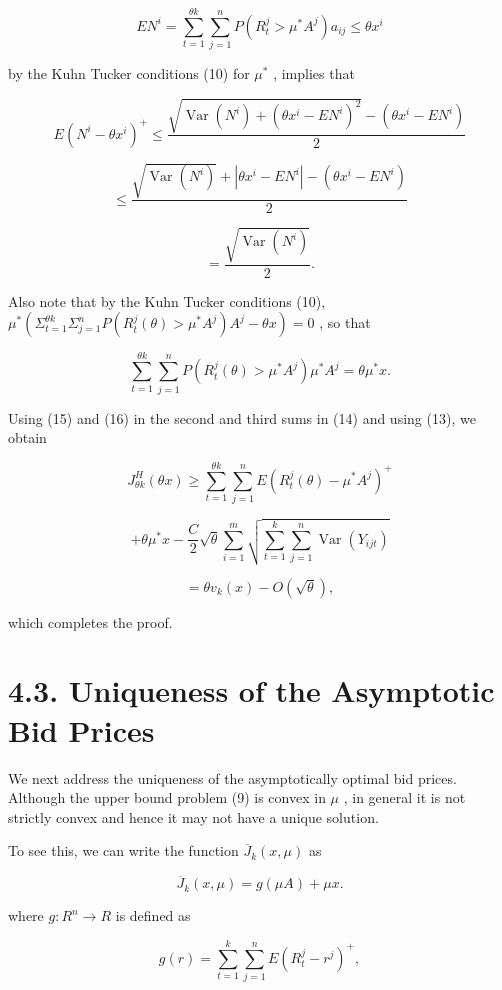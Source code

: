 \[
EN^{i} = \sum_{t = 1}^{\theta k} \sum_{j = 1}^{n} P(R_{t}^{j} > \mu^{*} A^{j}) a_{ij} \leq \theta x^{i}
\]

by the Kuhn Tucker conditions (10) for \(\mu^{*}\) , implies that

\[
E(N^{i} - \theta x^{i})^{+}\leq \frac{\sqrt{\operatorname{Var}(N^{i}) + (\theta x^{i} - E N^{i})^{2}} - (\theta x^{i} - E N^{i})}{2}
\]

\[
\leq \frac{\sqrt{\operatorname{Var}(N^{i})} + |\theta x^{i} - E N^{i}| - (\theta x^{i} - E N^{i})}{2}
\]

\[
= \frac{\sqrt{\operatorname{Var}(N^{i})}}{2}. \tag{15}
\]

Also note that by the Kuhn Tucker conditions (10),
\(\mu^{*}(\Sigma_{t = 1}^{\theta k}\Sigma_{j = 1}^{n}P(R_{t}^{j}(\theta) > \mu^{*}A^{j})A^{j} - \theta x) = 0\)
, so that

\[
\sum_{t = 1}^{\theta k}\sum_{j = 1}^{n}P(R_{t}^{j}(\theta) > \mu^{*}A^{j})\mu^{*}A^{j} = \theta \mu^{*}x. \tag{16}
\]

Using (15) and (16) in the second and third sums in (14) and using (13),
we obtain

\[
J_{\theta k}^{H}(\theta x)\geq \sum_{t = 1}^{\theta k}\sum_{j = 1}^{n}E(R_{t}^{j}(\theta) - \mu^{*}A^{j})^{+}
\]

\[
+\theta \mu^{*}x - \frac{C}{2}\sqrt{\theta}\sum_{i = 1}^{m}\sqrt{\sum_{t = 1}^{k}\sum_{j = 1}^{n}\operatorname{Var}(Y_{ijt})}
\]

\[
= \theta v_{k}(x) - O(\sqrt{\theta}),
\]

which completes the proof.

\section{4.3. Uniqueness of the Asymptotic Bid
Prices}\label{uniqueness-of-the-asymptotic-bid-prices}

We next address the uniqueness of the asymptotically optimal bid prices.
Although the upper bound problem (9) is convex in \(\mu\) , in general
it is not strictly convex and hence it may not have a unique solution.

To see this, we can write the function \(\overline{J}_{k}(x,\mu)\) as

\[
\overline{J}_{k}(x,\mu) = g(\mu A) + \mu x. \tag{17}
\]

where \(g:R^{n}\to R\) is defined as

\[
g(r) = \sum_{t = 1}^{k}\sum_{j = 1}^{n}E(R_{t}^{j} - r^{j})^{+}, \tag{18}
\]

